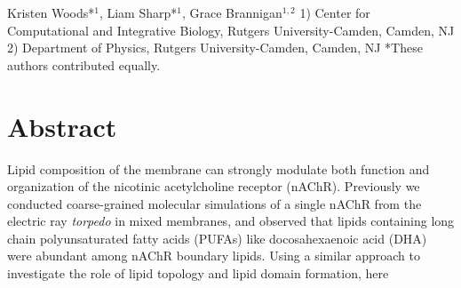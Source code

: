 


Kristen Woods*$^1$, Liam Sharp*$^1$, Grace Brannigan$^{1,2}$
{1) Center for Computational and Integrative Biology, Rutgers University-Camden, Camden, NJ}  {2) Department of Physics, Rutgers University-Camden, Camden, NJ}
*These authors contributed equally.

\section{Abstract}

Lipid composition of the membrane can strongly modulate both function and organization of the nicotinic acetylcholine receptor (nAChR). Previously we conducted coarse-grained molecular simulations of a single nAChR from the electric ray {\it torpedo} in mixed membranes, and observed that lipids containing long chain polyunsaturated fatty acids (PUFAs) like docosahexaenoic acid (DHA) were abundant among nAChR boundary lipids.   Using a similar approach to investigate the role of lipid topology and lipid domain formation, here
 
 
  
 
 
 
 

